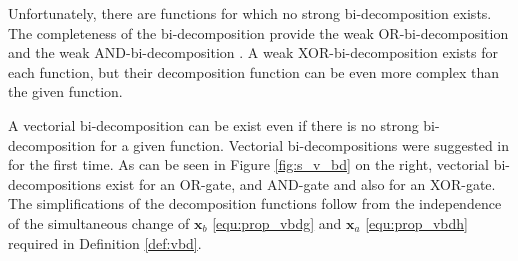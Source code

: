 \documentclass[a4paper]{article}
\newcommand\bx{\mathbf{x}}
\begin{document}

Unfortunately, there are functions for which no strong bi-decomposition exists. The completeness of the bi-decomposition provide the weak OR-bi-decomposition and the weak AND-bi-decomposition \cite{L_TQ_TKS_1989, PS_LFE_2004}. A weak XOR-bi-decomposition exists for each function, but their decomposition function can be even more complex than the given function. 

A vectorial bi-decomposition can be exist even if there is no strong bi-decomposition for a given function. Vectorial bi-decompositions were suggested in \cite{S_VBD_LF_RM_2015} for the first time. As can be seen in Figure \ref{fig:s_v_bd} on the right, vectorial bi-decompositions exist for an OR-gate, and AND-gate and also for an XOR-gate. The simplifications of the decomposition functions follow from the independence of the simultaneous change of $\bx_b$ \eqref{equ:prop_vbdg} and $\bx_a$ \eqref{equ:prop_vbdh} required in Definition \ref{def:vbd}.
\end{document}
